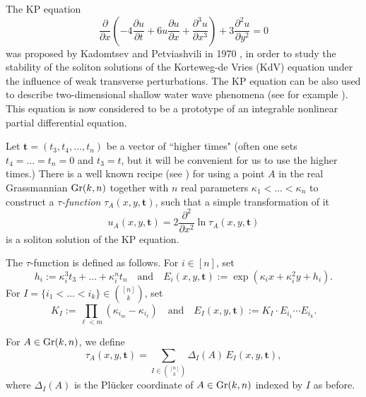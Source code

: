 \documentclass[11pt]{amsart}
\theoremstyle{plain}
\theoremstyle{definition}
\def\t{{\bm{t}}}
\def\Pl{\Delta}
\begin{document}
The KP equation 
\[
\frac{\partial}{\partial x}\left(-4\frac{\partial u}{\partial t}+6u\frac{\partial u}{\partial x}+\frac{\partial^3u}{\partial x^3}\right)+3\frac{\partial^2 u}{\partial y^2}=0
\]
was proposed by Kadomtsev and Petviashvili in 1970 \cite{KP70}, in order to
study the stability of the soliton solutions of the Korteweg-de Vries (KdV) equation
under the influence of weak transverse perturbations.
The KP equation can be also used to describe  two-dimensional shallow
water wave phenomena (see for example \cite{K10}).   This equation is now considered to be a prototype of
an integrable nonlinear partial differential equation.

Let $\t = (t_3, t_4,\dots, t_n)$ be a vector of ``higher times" (often one
sets $t_4 = \dots = t_n = 0$ and $t_3 = t$, but it will be convenient for us to 
use the higher times.)
There is a well known recipe
(see \cite{H04, CK1})
for using a point $A$ in the real Grassmannian $\operatorname{Gr}(k,n)$ together with 
$n$ real parameters $\kappa_1 < \dots < \kappa_n$ to construct a \emph{$\tau$-function} $\tau_A(x,y,\t)$,   such that a simple transformation of it
\begin{equation*}
u_A(x,y,\t)=2\frac{\partial^2}{\partial x^2}\ln\tau_A(x,y,\t)
\end{equation*}
 is a soliton solution of the KP equation.

 The $\tau$-function is defined as follows.
For $i\in[n]$, set 
\[h_i:=\kappa_i^3 t_3 + \dots + \kappa_i^n t_n\quad\text{and}\quad E_i(x,y,\t):=\exp 
(\kappa_i x + \kappa_i^2 y + h_i).\]
For $I=\{i_1<\dots<i_k\} \in {[n] \choose k}$,  set
\begin{equation}
 K_I:=\prod_{\ell<m}(\kappa_{i_m}-\kappa_{i_{\ell}})\quad\text{and}\quad E_I(x,y,\t):=K_I\cdot E_{i_1}\cdots E_{i_k}.\label{eq:K_E_kappa}
\end{equation}


For $A\in\operatorname{Gr}(k,n)$, we define 
 \begin{equation}\label{tau}
\tau_A(x,y,\t)=\sum_{I\in\binom{[n]}{k}}\Pl_I(A)\,E_I(x,y,\t),
\end{equation}
where $\Pl_I(A)$ is the Pl\"ucker coordinate of $A\in\operatorname{Gr}(k,n)$ indexed by $I$ as before.
\end{document}
